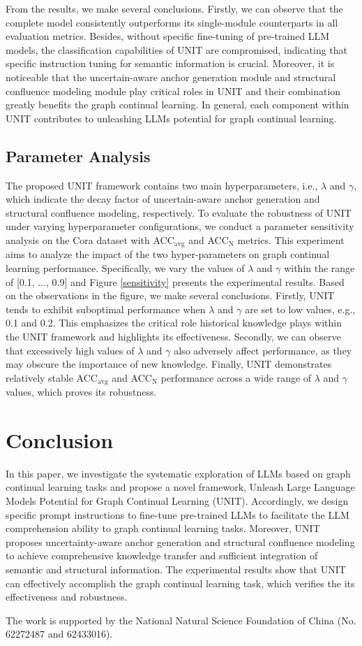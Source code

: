 \documentclass[sigconf]{acmart}
\begin{document}
From the results, we make several conclusions.
Firstly, we can observe that the complete model consistently outperforms its single-module counterparts in all evaluation metrics.
Besides, without specific fine-tuning of pre-trained LLM models, the classification capabilities of UNIT are compromised, indicating that specific instruction tuning for semantic information is crucial.
Moreover, it is noticeable that the uncertain-aware anchor generation module and structural confluence modeling module play critical roles in UNIT and their combination greatly benefits the graph continual learning. 
In general, each component within UNIT contributes to unleashing LLMs potential for graph continual learning.


\subsection{Parameter Analysis}
The proposed UNIT framework contains two main hyperparameters, i.e., $\lambda$ and $\gamma$, which indicate the decay factor of uncertain-aware anchor generation and structural confluence modeling, respectively.
To evaluate the robustness of UNIT under varying hyperparameter configurations, we conduct a parameter sensitivity analysis on the Cora dataset with ACC$_{\text{avg}}$ and ACC$_{\text{N}}$ metrics. 
This experiment aims to analyze the impact of the two hyper-parameters on graph continual learning performance.
Specifically, we vary the values of $\lambda$ and $\gamma$ within the range of
[0.1, $\ldots$, 0.9] and Figure \ref{sensitivity} presents the experimental results.
Based on the observations in the figure, we make several conclusions.
Firstly, UNIT tends to exhibit suboptimal performance when $\lambda$ and $\gamma$ are set to low values, e.g., 0.1 and 0.2.
This emphasizes the critical role historical knowledge plays within the UNIT framework and highlights its effectiveness.
Secondly, we can observe that excessively high values of $\lambda$ and $\gamma$ also adversely affect performance, as they may obscure the importance of new knowledge.
Finally, UNIT demonstrates relatively stable ACC$_{\text{avg}}$ and ACC$_{\text{N}}$ performance across a wide range of $\lambda$ and $\gamma$ values, which proves its robustness.



\section{Conclusion}
In this paper, we investigate the systematic exploration of LLMs based on graph continual learning tasks and propose a novel framework, Unleash Large Language Models Potential for Graph Continual Learning (UNIT).
Accordingly, we design specific prompt instructions to fine-tune pre-trained LLMs to facilitate the LLM comprehension ability to graph continual learning tasks.
Moreover, UNIT proposes uncertainty-aware anchor generation and structural confluence modeling to achieve comprehensive knowledge transfer and sufficient integration of semantic and structural information.
The experimental results show that UNIT can effectively accomplish the graph continual learning task, which verifies the its effectiveness and robustness.

\begin{acks}
The work is supported by the National Natural Science Foundation of China (No. 62272487 and 62433016).
\end{acks}


\end{document}
